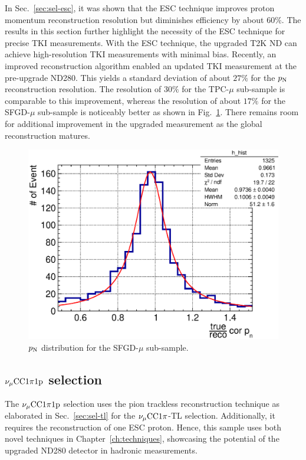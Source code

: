      In Sec.~\ref{sec:sel-esc}, it was shown that the ESC technique improves proton momentum reconstruction resolution but diminishes efficiency by about $60\%$.
     The results in this section further highlight the necessity of the ESC technique for precise TKI measurements.
     With the ESC technique, the upgraded T2K ND can achieve high-resolution TKI measurements with minimal bias.
     Recently, an improved reconstruction algorithm enabled an updated TKI measurement at the pre-upgrade ND280.
     This yields a standard deviation of about $27\%$ for the $p_\textrm{N}$ reconstruction resolution.
     The resolution of $30\%$ for the TPC-$\mu$ sub-sample is comparable to this improvement, whereas the resolution of about $17\%$ for the SFGD-$\mu$ sub-sample is noticeably better as shown in Fig.~\ref{fig:sfgmu-0pi-pn}.
     There remains room for additional improvement in the upgraded measurement as the global reconstruction matures.
     \begin{figure}
          \centering
          \includegraphics[width=\sgfigwid\textwidth]{figures/perf/tki/cor_pn_rat_hist_al11_sfgmu.eps}
          \caption{\label{fig:sfgmu-0pi-pn} $p_\textrm{N}$ distribution for the SFGD-$\mu$ sub-sample.}
     \end{figure}

     \subsection{$\nu_{\mu}\textrm{CC}1\pi1\textrm{p}$ selection}
     \label{sec:mc-tki-1pi}
     The $\nu_{\mu}\textrm{CC}1\pi1\textrm{p}$ selection uses the pion trackless reconstruction technique as elaborated in Sec.~\ref{sec:sel-tl} for the $\nu_{\mu}\textrm{CC}1\pi$-TL selection.
     Additionally, it requires the reconstruction of one ESC proton.
     Hence, this sample uses both novel techniques in Chapter~\ref{ch:techniques}, showcasing the potential of the upgraded ND280 detector in hadronic measurements.

